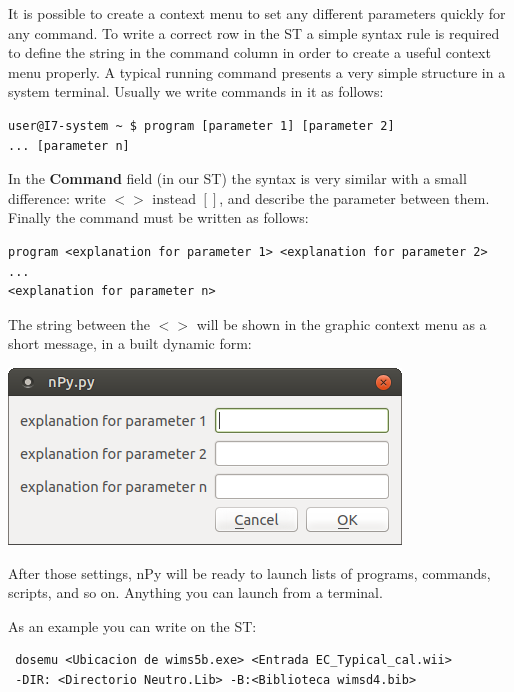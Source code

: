 \documentclass[a4paper,10pt]{article}
\begin{document}
It is possible to create a context menu to set any different parameters quickly for any command. To write a correct row in the ST a simple syntax rule is required to define the string in the command column in order to create a useful context menu properly. A typical running command presents a very simple structure in a system terminal. Usually we write commands in it as follows:

\begin{verbatim}
user@I7-system ~ $ program [parameter 1] [parameter 2] 
... [parameter n]
\end{verbatim}

In the \textbf{Command} field (in our ST) the syntax is very similar with a small difference: write $< >$ instead $[]$, and describe the parameter between them. Finally the command must be written as follows:

\begin{verbatim}
program <explanation for parameter 1> <explanation for parameter 2> 
... 
<explanation for parameter n>
 \end{verbatim}

The string between the $< >$ will be shown in the graphic context menu as a short message, in a built dynamic form: 
\begin{center}
 \includegraphics[width=\textwidth]{img/contextMenuExampleString.png}
\end{center}

\bigskip 

After those settings, nPy will be ready to launch lists of programs, commands, scripts, and so on. Anything you can launch from a terminal.

\bigskip 

\noindent As an example you can write on the ST:
\begin{verbatim}
 dosemu <Ubicacion de wims5b.exe> <Entrada EC_Typical_cal.wii> 
 -DIR: <Directorio Neutro.Lib> -B:<Biblioteca wimsd4.bib>
 \end{verbatim}
 
\end{document}
